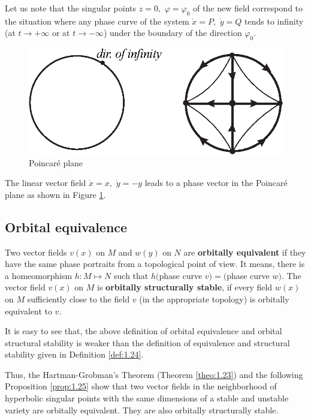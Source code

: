 Let us note that the singular points $z=0,$ $\varphi =\varphi _{0}$ of the new field correspond to the situation where any phase curve of the system $\dot{x}=P,$ $\dot{y}=Q$ tends to infinity (at $t\rightarrow +\infty $ or at $t\rightarrow -\infty$) under the boundary of the direction $ \varphi _ {0}$.

\begin{figure}[!ht]
		\centering
		\includegraphics [scale=1]{jtr220}
		\caption{Poincaré plane}
		\label{fig:2.20}
\end{figure}

\begin{example}
	The linear vector field $\dot{x}=x,$ $\dot{y}=-y$ leads to a phase vector in the Poincaré plane as shown in Figure \ref{fig:2.20}.
\end{example}

\subsection{Orbital equivalence}

\begin{definition}
	Two vector fields $v (x)$ on $M$ and $w (y)$ on $N$ are \textbf{orbitally equivalent} if they have the same phase portraits from a topological point of view. It means, there is a homeomorphism $h:M\longmapsto N$ such that $h ($phase curve $v) = ($phase curve $w)$.
	The vector field $v (x)$ on $M$ is \textbf{orbitally structurally stable}, if every field $w(x)$ on $M$ sufficiently close to the field $v$ (in the appropriate topology) is orbitally equivalent to $v$.
\end{definition}

It is easy to see that, the above definition of orbital equivalence and orbital structural stability is weaker than the definition of equivalence and structural stability given in Definition \ref{def:1.24}.

Thus, the Hartman-Grobman's Theorem (Theorem \ref{theo:1.23}) and the following Proposition \ref{prop:1.25} show that two vector fields in the neighborhood of hyperbolic singular points with the same dimensions of a stable and unstable variety are orbitally equivalent. They are also orbitally structurally stable.

